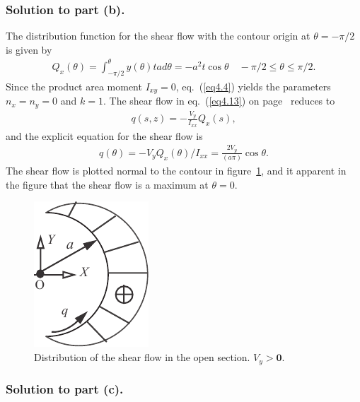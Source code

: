 \documentclass{AeroStructure-ERJohnson}
\begin{document}
\begin{example*}
\subsubsection{Solution to part (b).} The distribution function for the shear flow with the contour origin at $\theta=-\pi/ 2$ is given by
\begin{align}\label{ex4.7d}
Q_{x}(\theta)=\int_{-\pi/2}^{\theta} y(\theta) \textit{tad} \theta=-a^{2} t \cos \theta \quad-\pi/2 \leq \theta \leq \pi/2.\end{align}
Since the product area moment $I_{x y}=0$, eq.~(\ref{eq4.4}) yields the parameters $n_{x}=n_{y}=0$ and $k=1$. The shear flow in eq.~(\ref{eq4.13}) on page~\pageref{eq4.13} reduces to
\begin{align}\label{ex4.7e}
q(s, z)=-\frac{V_{y}}{I_{x x}} Q_{x}(s),\end{align}
and the explicit equation for the shear flow is
\begin{align}\label{ex4.7f}
q(\theta)=-V_{y} Q_{x}(\theta)/I_{x x}=\frac{2 V_{y}}{(a \pi)} \cos \theta.\end{align}
The shear flow is plotted normal to the contour in figure~\ref{fig4.25}, and it apparent in the figure that the shear flow is a maximum at $\theta = 0$.


\begin{figure}
\vspace{-24pt}
\includegraphics{Figure_4-25.pdf}
\caption{Distribution of the shear flow in the open section. $V_{y} > \textbf{0}$.\label{fig4.25}}
\end{figure}
\subsubsection{Solution to part (c).}


\end{example*}
\end{document}
